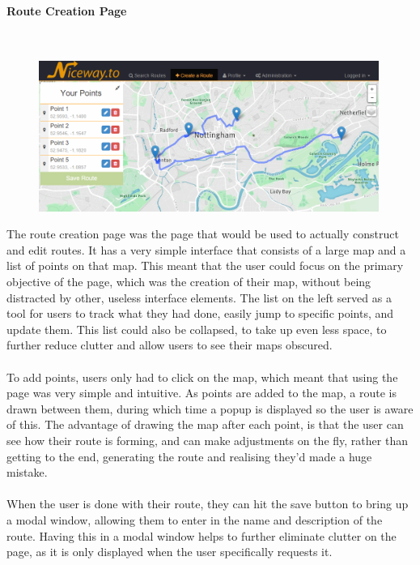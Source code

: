 \paragraph{Route Creation Page}\ \\
\begin{figure}[!ht]
	\vspace{-5mm}
	\begin{center}
		\includegraphics[width=0.99\textwidth]{images/design/create.png}
	\end{center}
	\vspace{-5mm}
\end{figure}

\noindent 
The route creation page was the page that would be used to actually construct and edit routes. It has a very simple interface that consists of a large map and a list of points on that map. This meant that the user could focus on the primary objective of the page, which was the creation of their map, without being distracted by other, useless interface elements. The list on the left served as a tool for users to track what they had done, easily jump to specific points, and update them. This list could also be collapsed, to take up even less space, to further reduce clutter and allow users to see their maps obscured.\ \\
\ \\
To add points, users only had to click on the map, which meant that using the page was very simple and intuitive. As points are added to the map, a route is drawn between them, during which time a popup is displayed so the user is aware of this. The advantage of drawing the map after each point, is that the user can see how their route is forming, and can make adjustments on the fly, rather than getting to the end, generating the route and realising they'd made a huge mistake. \ \\
\ \\
When the user is done with their route, they can hit the save button to bring up a modal window, allowing them to enter in the name and description of the route. Having this in a modal window helps to further eliminate clutter on the page, as it is only displayed when the user specifically requests it.

